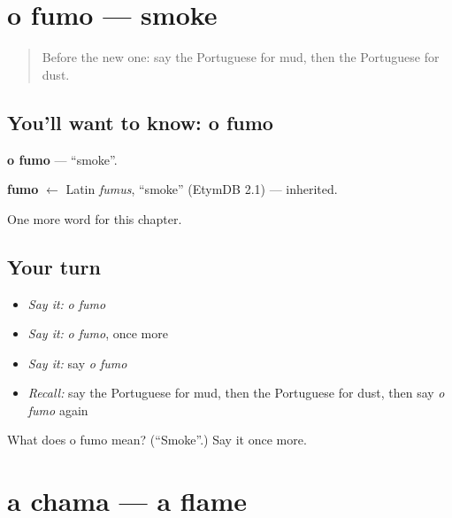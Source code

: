 \section[o fumo]{o fumo — smoke}

\label{lesson:PT-C195-fumo}



\begin{quote}
Before the new one: say the Portuguese for mud, then the Portuguese for dust.
\end{quote}

\subsection*{You'll want to know: o fumo}
\textbf{o fumo} — \textquotedblleft{}smoke\textquotedblright{}.

\begin{cousinweb}
\textbf{fumo} $\leftarrow$ Latin \emph{fumus}, \textquotedblleft{}smoke\textquotedblright{} (EtymDB 2.1) — inherited.
\end{cousinweb}

\begin{grammarlens}[title={What you've built}]
One more word for this chapter.
\end{grammarlens}

\subsection*{Your turn}
\begin{itemize}
\raggedright
  \item \emph{Say it:} \emph{o fumo}
  \item \emph{Say it:} \emph{o fumo}, once more
  \item \emph{Say it:} say \emph{o fumo}
  \item \emph{Recall:} say the Portuguese for mud, then the Portuguese for dust, then say \emph{o fumo} again
\end{itemize}

\begin{tcolorbox}[breakable,colback=teal!4,colframe=teal!35!black,title={Before you move on}]
What does o fumo mean? (\textquotedblleft{}Smoke\textquotedblright{}.) Say it once more.
\end{tcolorbox}
\section[a chama]{a chama — a flame}

